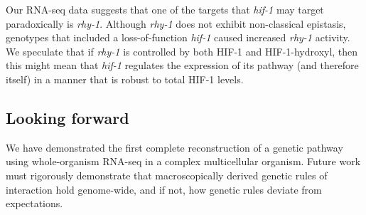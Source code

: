 \documentclass[9pt,twocolumn,twoside]{pnas-new}
\newcommand{\rhy}{\emph{rhy-1}}
\newcommand{\hif}{\emph{hif-1}}
\newcommand{\hifp}{HIF-1}
\begin{document}
Our RNA-seq data suggests that one of the targets that \hif{} may target
paradoxically is \rhy{}. Although \rhy{} does not exhibit non-classical epistasis,
genotypes that included a loss-of-function \hif{} caused increased \rhy{} activity.
We speculate that if \rhy{} is controlled by both \hifp{} and \hifp{}-hydroxyl,
then this might mean that \hif{} regulates the expression of its pathway (and
therefore itself) in a manner that is robust to total \hifp{} levels.

\subsection{Looking forward}
We have demonstrated the first complete reconstruction of a genetic pathway using
whole-organism RNA-seq in a complex multicellular organism. Future work must
rigorously demonstrate that macroscopically derived genetic rules of interaction
hold genome-wide, and if not, how genetic rules deviate from expectations.
\end{document}
